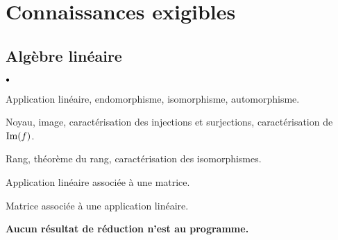 \documentclass[11pt]{article}%
\begin{document}
\section*{Connaissances exigibles}

\subsection*{Algèbre linéaire}

\begin{noliste}{$\scriptstyle \bullet$}
  \item Application linéaire, endomorphisme, isomorphisme, 
  automorphisme.
\item Noyau, image, caractérisation des injections et surjections, 
caractérisation de $\operatorname{Im}(f)$.
\item Rang, théorème du rang, caractérisation des isomorphismes.
\item Application linéaire associée à une matrice.
\item Matrice associée à une application linéaire.
\item {\bf Aucun résultat de réduction n'est au programme.}
\end{noliste}
\end{document}
